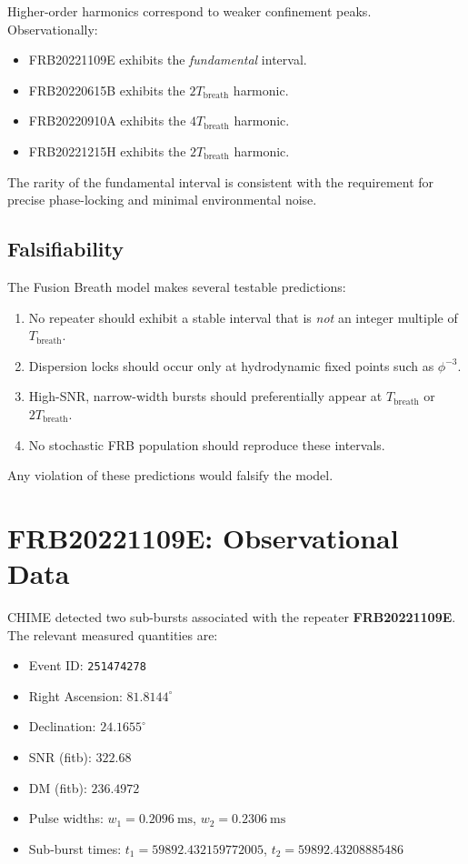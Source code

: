 \documentclass[12pt]{report}
\begin{document}
Higher-order harmonics correspond to weaker confinement peaks. Observationally:

\begin{itemize}
    \item FRB20221109E exhibits the \emph{fundamental} interval.
    \item FRB20220615B exhibits the $2T_{\text{breath}}$ harmonic.
    \item FRB20220910A exhibits the $4T_{\text{breath}}$ harmonic.
    \item FRB20221215H exhibits the $2T_{\text{breath}}$ harmonic.
\end{itemize}

The rarity of the fundamental interval is consistent with the requirement for
precise phase-locking and minimal environmental noise.

\subsection{Falsifiability}

The Fusion Breath model makes several testable predictions:

\begin{enumerate}
    \item No repeater should exhibit a stable interval that is \emph{not} an
    integer multiple of $T_{\text{breath}}$.
    \item Dispersion locks should occur only at hydrodynamic fixed points such
    as $\phi^{-3}$.
    \item High-SNR, narrow-width bursts should preferentially appear at
    $T_{\text{breath}}$ or $2T_{\text{breath}}$.
    \item No stochastic FRB population should reproduce these intervals.
\end{enumerate}

Any violation of these predictions would falsify the model.


\section{FRB20221109E: Observational Data}

CHIME detected two sub-bursts associated with the repeater
\textbf{FRB20221109E}. The relevant measured quantities are:

\begin{itemize}
    \item Event ID: \texttt{251474278}
    \item Right Ascension: $81.8144^\circ$
    \item Declination: $24.1655^\circ$
    \item SNR (fitb): $322.68$
    \item DM (fitb): $236.4972$
    \item Pulse widths: $w_1 = 0.2096\ \text{ms}$, $w_2 = 0.2306\ \text{ms}$
    \item Sub-burst times: $t_1 = 59892.432159772005$, $t_2 = 59892.43208885486$
\end{itemize}
\end{document}
